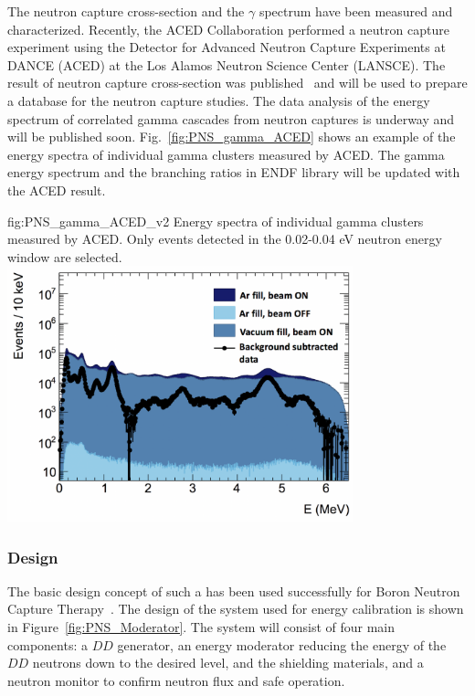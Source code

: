 The neutron capture cross-section and the $\gamma$ spectrum have been measured and characterized. Recently, the ACED Collaboration performed a neutron capture experiment using  the Detector  for Advanced  Neutron  Capture  Experiments  at DANCE (ACED)  at the  Los  Alamos  Neutron  Science  Center  (LANSCE). The result of neutron capture cross-section was published~\cite{Fischer:2019qfr} and will be used to prepare a database for the neutron capture studies. The data analysis of the energy spectrum of correlated gamma cascades from neutron captures is underway and will be published soon. Fig.~\ref{fig:PNS_gamma_ACED} shows an example of the energy spectra of individual gamma clusters measured by ACED. The gamma energy spectrum and the branching ratios in ENDF library will be updated with the ACED result. 

\begin{dunefigure}{fig:PNS_gamma_ACED_v2}
{Energy spectra of individual gamma clusters measured by ACED. Only events detected in the 0.02-0.04 eV neutron energy window are selected.}
\includegraphics[width=10cm]{graphics/PNS_gamma_ACED_v2.png}
\end{dunefigure}


\subsubsection{Design}
\label{sec:sp-calib-sys-pns-des}

The basic design concept of such a  has been used successfully for Boron Neutron Capture Therapy~\cite{bib:Koivunoro2004}. The design of the  system used for energy calibration is shown in Figure~\ref{fig:PNS_Moderator}. The system will consist of four main components: a $DD$ generator, an energy moderator reducing the energy of the $DD$ neutrons down to the desired level, and the shielding materials, and a neutron monitor to confirm neutron flux and safe operation. 

